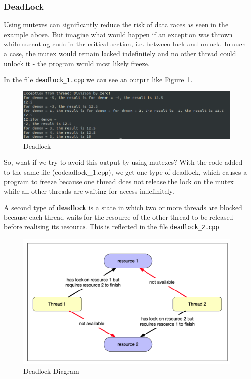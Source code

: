 \documentclass[11pt, a4paper]{article}
\begin{document}
\subsubsection{DeadLock}%
\label{ssub:deadlock}

Using mutexes can significantly reduce the risk of data races as seen in the example above. But imagine what would happen if an exception was thrown while executing code in the critical section, i.e. between lock and unlock. In such a case, the mutex would remain locked indefinitely and no other thread could unlock it - the program would most likely freeze.

In the file \texttt{deadlock\_1.cpp} we can see an output like Figure~\ref{fig:deadlock}.


\begin{figure}[htpb!]
	\centering
	\includegraphics[width=0.8\linewidth]{deadlock}
	\caption{Deadlock}
	\label{fig:deadlock}
\end{figure}


So, what if we try to avoid this output by using mutexes? With the code added to the same file (codeadlock\_1.cpp), we get one type of deadlock, which causes a program to freeze because one thread does not release the lock on the mutex while all other threads are waiting for access indefinitely. 




A second type of \textbf{deadlock} is a state in which two or more threads are blocked because each thread waits for the resource of the other thread to be released before realising its resource. This is reflected in the file \texttt{deadlock\_2.cpp} 


\begin{figure}[htpb!]
	\centering
	\includegraphics[width=0.8\linewidth]{deadlock_diagram}
	\caption{Deadlock Diagram}
	\label{fig:deadlock_diagram}
\end{figure}
\end{document}
